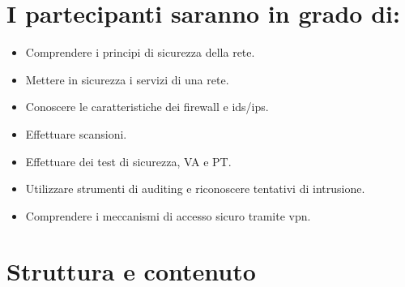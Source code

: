 \section{I partecipanti saranno in grado di:}

\begin{itemize}
\item Comprendere i principi di sicurezza della rete.
\item Mettere in sicurezza i servizi di una rete.
\item Conoscere le caratteristiche dei firewall e ids/ips.
\item Effettuare scansioni.
\item Effettuare dei test di sicurezza, VA e PT.
\item Utilizzare strumenti di auditing e riconoscere tentativi di intrusione.
\item Comprendere i meccanismi di accesso sicuro tramite vpn.
\end{itemize}

\section{Struttura e contenuto}

